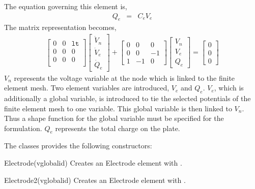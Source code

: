 The equation governing this element is,
\begin{eqnarray}
Q_e &=& C_e V_e
\end{eqnarray}
The matrix representation becomes,
\begin{eqnarray}
\left[
\begin{array}{ccc}
0 & 0 & \mathtt{lt}  \\
0 & 0 & 0  \\
0 & 0 & 0  \\
\end{array}
\right]
\left[
\begin{array}{c}
\dot{V}_n \\
\dot{V}_e \\
\dot{Q}_e
\end{array}
\right]
+
\left[
\begin{array}{rrr}
0  &  0 & 0  \\
0  &  0 &-1  \\
1  & -1 & 0
\end{array}
\right]
\left[
\begin{array}{c}
{V}_n \\
{V}_e \\
{Q}_e
\end{array}
\right]
=
\left[
\begin{array}{c}
0 \\
0 \\
0
\end{array}
\right]
\end{eqnarray}
$V_n$ represents the voltage variable at the node which
is linked to the finite element mesh. Two element variables
are introduced, $V_e$ and $Q_e$. 
$V_e$, which is additionally a global variable, is introduced 
to tie the selected
potentials of the finite element mesh to one variable. 
This global variable is then linked to $V_n$. Thus a 
shape function for the global variable must  be specified
for the formulation. $Q_e$ represents the total charge on 
the plate. 

The classes provides the following constructors:
\begin{codelist}

  \item[Electrode(vglobalid)] Creates an Electrode element 
  with .

  \item[Electrode2(vglobalid)] Creates an Electrode element 
  with .

\end{codelist}

